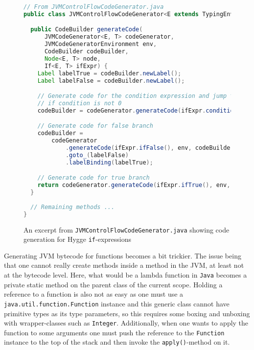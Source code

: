\begin{figure}[H]
\centering 
\begin{lstlisting}[language=Java]
// From JVMControlFlowCodeGenerator.java
public class JVMControlFlowCodeGenerator<E extends TypingEnvironment, T extends Type> {

  public CodeBuilder generateCode(
      JVMCodeGenerator<E, T> codeGenerator,
      JVMCodeGeneratorEnvironment env,
      CodeBuilder codeBuilder,
      Node<E, T> node,
      If<E, T> ifExpr) {
    Label labelTrue = codeBuilder.newLabel();
    Label labelFalse = codeBuilder.newLabel();

    // Generate code for the condition expression and jump to true branch
    // if condition is not 0
    codeBuilder = codeGenerator.generateCode(ifExpr.condition(), env, codeBuilder).ifne(labelTrue);

    // Generate code for false branch
    codeBuilder =
        codeGenerator
            .generateCode(ifExpr.ifFalse(), env, codeBuilder)
            .goto_(labelFalse)
            .labelBinding(labelTrue);

    // Generate code for true branch
    return codeGenerator.generateCode(ifExpr.ifTrue(), env, codeBuilder).labelBinding(labelFalse);
  }
 
  // Remaining methods ...
}
\end{lstlisting}
\caption{An excerpt from \texttt{JVMControlFlowCodeGenerator.java} showing code generation for Hygge \texttt{if}-expressions}
\label{fig:jvm_if_expressions}
\end{figure}

Generating JVM bytecode for functions becomes a bit trickier. The issue being that one cannot really create methods inside a method in the JVM,
at least not at the bytecode level. Here, what would be a lambda function in \texttt{Java} becomes a private static method on the parent class
of the current scope. Holding a reference to a function is also not as easy as one must use a \texttt{java.util.function.Function} instance and
this generic class cannot have primitive types as its type parameters, so this requires some boxing and unboxing with wrapper-classes such as \texttt{Integer}.
Additionally, when one wants to apply the function to some arguments one must push the reference to the \texttt{Function} instance to the top of
the stack and then invoke the \texttt{apply()}-method on it.

